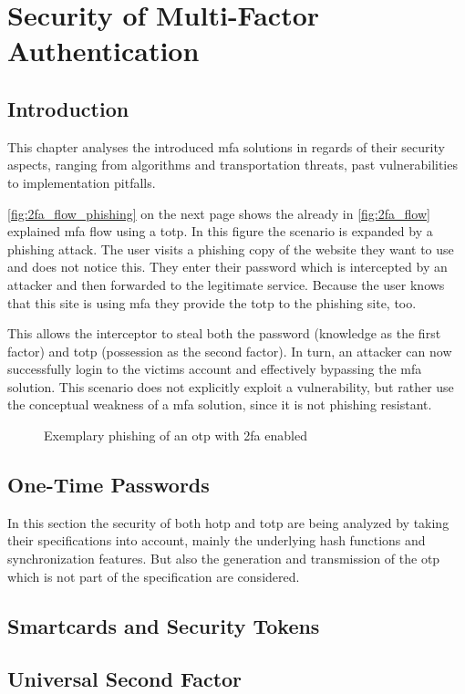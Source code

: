 \chapter{Security of Multi-Factor Authentication}

\section{Introduction}

This chapter analyses the introduced \gls{mfa} solutions in regards of their security aspects, ranging from algorithms and transportation threats, past vulnerabilities to implementation pitfalls.

\autoref{fig:2fa_flow_phishing} on the next page shows the already in \autoref{fig:2fa_flow} explained \gls{mfa} flow using a \gls{totp}. In this figure the scenario is expanded by a phishing attack. The user visits a phishing copy of the website they want to use and does not notice this. They enter their password which is intercepted by an attacker and then forwarded to the legitimate service. Because the user knows that this site is using \gls{mfa} they provide the \gls{totp} to the phishing site, too.

This allows the interceptor to steal both the password (knowledge as the first factor) and \gls{totp} (possession as the second factor). In turn, an attacker can now successfully login to the victims account and effectively bypassing the \gls{mfa} solution. This scenario does not explicitly exploit a vulnerability, but rather use the conceptual weakness of a \gls{mfa} solution, since it is not phishing resistant.

\newpage

\begin{figure}[hbt]
	\centering
	
	\caption[Exemplary phishing of an \gls{otp} with \gls{2fa} enabled]{Exemplary phishing of an \gls{otp} with \gls{2fa} enabled\footnotemark}
	\label{fig:2fa_flow_phishing}
\end{figure}

\section{One-Time Passwords}
\label{sec:totp_sec}

In this section the security of both \gls{hotp} and \gls{totp} are being analyzed by taking their specifications into account, mainly the underlying hash functions and synchronization features. But also the generation and transmission of the \gls{otp} which is not part of the specification are considered.



\section{Smartcards and Security Tokens}
\label{sec:tokens}



\section{Universal Second Factor}
\label{sec:u2f}


